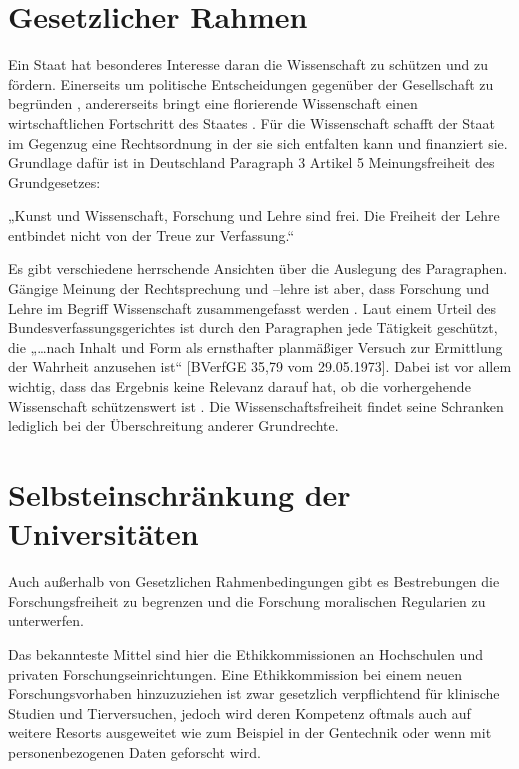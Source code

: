 \documentclass{pmwk}
\begin{document}
\section*{Gesetzlicher Rahmen}
Ein Staat hat besonderes Interesse daran die Wissenschaft zu schützen und zu fördern. Einerseits um politische Entscheidungen gegenüber der Gesellschaft zu begründen \cite[11]{Huber}, andererseits bringt eine florierende Wissenschaft einen wirtschaftlichen Fortschritt des Staates \cite[35]{Huber}. Für die Wissenschaft schafft der Staat im Gegenzug eine Rechtsordnung in der sie sich entfalten kann und finanziert sie. Grundlage dafür ist in Deutschland Paragraph 3 Artikel 5 Meinungsfreiheit des Grundgesetzes:\par
„Kunst und Wissenschaft, Forschung und Lehre sind frei. Die Freiheit der Lehre entbindet nicht von der Treue zur Verfassung.“ \cite[Art 5 § 3]{gg}\par
Es gibt verschiedene herrschende Ansichten über die Auslegung des Paragraphen. Gängige Meinung der Rechtsprechung und –lehre ist aber, dass Forschung und Lehre im Begriff Wissenschaft zusammengefasst werden \cite[27]{RechFrei}. Laut einem Urteil des Bundesverfassungsgerichtes ist durch den Paragraphen jede Tätigkeit geschützt, die „…nach Inhalt und Form als ernsthafter planmäßiger Versuch zur Ermittlung der Wahrheit anzusehen ist“ [BVerfGE 35,79 vom 29.05.1973]. Dabei ist vor allem wichtig, dass das Ergebnis keine Relevanz darauf hat, ob die vorhergehende Wissenschaft schützenswert ist \cite[13]{WisArb}. Die Wissenschaftsfreiheit findet seine Schranken lediglich bei der Überschreitung anderer Grundrechte\cite[61]{Huber}.

\section*{Selbsteinschränkung der Universitäten}
Auch außerhalb von Gesetzlichen Rahmenbedingungen gibt es Bestrebungen die Forschungsfreiheit zu begrenzen und die Forschung moralischen Regularien zu unterwerfen.\par

Das bekannteste Mittel sind hier die Ethikkommissionen an Hochschulen und privaten Forschungseinrichtungen. Eine Ethikkommission bei einem neuen Forschungsvorhaben hinzuzuziehen ist zwar gesetzlich verpflichtend für klinische Studien und Tierversuchen, jedoch wird deren Kompetenz oftmals auch auf weitere Resorts ausgeweitet wie zum Beispiel in der Gentechnik oder wenn mit personenbezogenen Daten geforscht wird.\par
\end{document}
